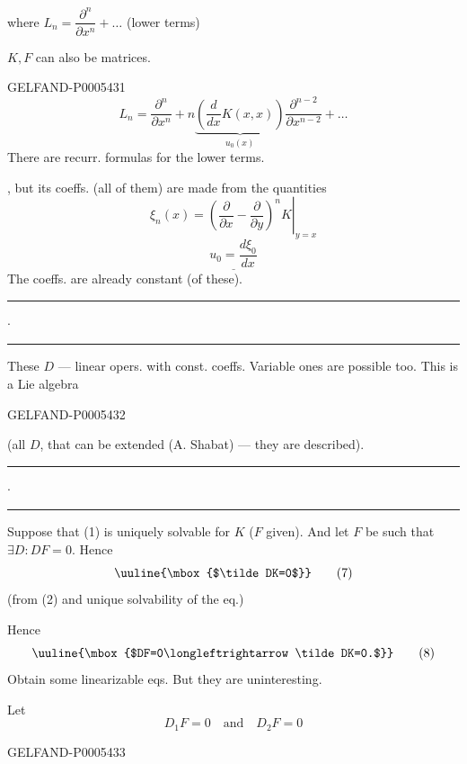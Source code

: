 where \(L_n=\dfrac{\partial^n}{\partial x^n}+\ldots\) (lower terms)

\(K,F\) can also be matrices.


\begin{GelfandAdjacentEvidence}{GELFAND-P000543}{1}
\[
L_n=\frac{\partial^n}{\partial x^n}
+n\underbrace{\left(\frac d{dx}K(x,x)\right)}_{u_0(x)}
\frac{\partial^{n-2}}{\partial x^{n-2}}+\ldots\tag{6}
\]
There are recurr. formulas for the lower terms.

, but its coeffs. (all of them) are made from the quantities
\[
\xi_n(x)=\left.\left(\frac{\partial}{\partial x}-
\frac{\partial}{\partial y}\right)^n K\right|_{y=x}
\]
\[
\underline{u_0=\frac{d\xi_0}{dx}}
\]
The coeffs. are already constant (of these).

\hfill\rule{1.05cm}{.35pt}\enspace\(\cdot\)\enspace\rule{1.45cm}{.35pt}\par

These \(D\) — linear opers. with const. coeffs. Variable ones are possible too. This is a Lie algebra
\end{GelfandAdjacentEvidence}
\begin{GelfandAdjacentEvidence}{GELFAND-P000543}{2}

(all \(D\), that can be extended (A. Shabat) — they are described).
\hfill\rule{1.05cm}{.35pt}\enspace\(\cdot\)\enspace\rule{1.45cm}{.35pt}\par

Suppose that (1) is uniquely solvable for \(K\) (\(F\) given).
And let \(F\) be such that \(\exists D\colon DF=0\). Hence
\[
\uuline{\mbox{$\tilde DK=0$}}\tag{7}
\]
(from (2) and unique solvability of the eq.)

Hence
\[
\uuline{\mbox{$DF=0\longleftrightarrow\tilde DK=0.$}}\tag{8}
\]
Obtain some linearizable eqs. But they are uninteresting.

Let
\[
D_1F=0\quad\text{and}\quad D_2F=0\tag{9}
\]
\end{GelfandAdjacentEvidence}
\begin{GelfandAdjacentEvidence}{GELFAND-P000543}{3}

\end{GelfandAdjacentEvidence}
